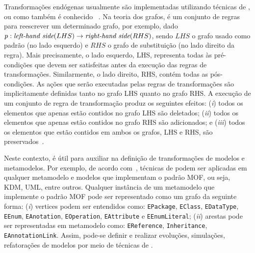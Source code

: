 Transformações endógenas usualmente são implementadas utilizando técnicas de , ou como também é conhecido ~\cite{Ehrig_2006}. Na teoria dos grafos,  é um conjunto de regras para reescrever um determinado grafo, por exemplo, dado $p: \emph{left-hand side} (LHS) \rightarrow \emph{right-hand side} (RHS)$, sendo $LHS$ o grafo usado como padrão (no lado esquerdo) e $RHS$ o grafo de substituição (no lado direito da regra). Mais precisamente, o lado esquerdo, LHS, representa todas às pré-condições que devem ser satisfeitas antes da execução das regras de transformações. Similarmente, o lado direito, RHS, contém todas as pós-condições. As ações que serão executadas pelas regras de transformações são implicitamente definidas tanto no grafo LHS quanto no grafo RHS. A execução de um conjunto de regra de transformação produz os seguintes efeitos: (\textit{i}) todos os elementos que apenas estão contidos no grafo LHS são deletados; (\textit{ii}) todos os elementos que apenas estão contidos no grafo RHS são adicionados; e (\textit{iii}) todos os elementos que estão contidos em ambos os grafos, LHS e RHS, são preservados~\cite{Ehrig_2006}. 

Neste contexto,  é útil para auxiliar na definição de transformações de modelos e metamodelos. Por exemplo, de acordo com~, técnicas de  podem ser aplicadas em qualquer metamodelo e modelos que implementam o padrão MOF, ou seja, KDM, UML, entre outros. Qualquer instância de um metamodelo que implemente o padrão MOF pode ser representado como um grafo da seguinte forma: (\textit{i}) vertices podem ser entendidos como: \texttt{EPackage}, \texttt{EClass}, \texttt{EDataType}, \texttt{EEnum}, \texttt{EAnotation}, \texttt{EOperation}, \texttt{EAttribute} e \texttt{EEnumLiteral}; (\textit{ii}) arestas pode ser representadas em metamodelo como: \texttt{EReference}, \texttt{Inheritance}, \texttt{EAnnotationLink}. Assim, pode-se definir e realizar evoluções, simulações, refatorações de modelos por meio de técnicas de . 


